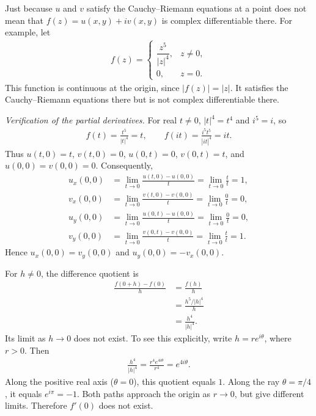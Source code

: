 \documentclass[11pt]{article}
\theoremstyle{plain}
\theoremstyle{definition}
\theoremstyle{remark}
\numberwithin{equation}{section}
\newcommand{\be}{\begin{eqnarray}}
\newcommand{\ee}{\end{eqnarray}}
\begin{document}
\begin{tcolorbox}[
 enhanced,breakable,
 colback=red!4,colframe=red!70!black,
 colbacktitle=red!70!black,coltitle=white,
 fonttitle=\bfseries,
 title={Warning: The Cauchy--Riemann equations alone do not suffice},
 boxrule=0.7pt,arc=2pt,
 left=6pt,right=6pt,top=5pt,bottom=5pt
]
Just because $u$ and $v$ satisfy the Cauchy--Riemann equations at a point
does not mean that $f(z)=u(x,y)+iv(x,y)$ is complex differentiable there. For example, let
\be
 f(z)=\begin{cases}
 \dfrac{z^5}{|z|^4},&z\ne0,\\[0.6em]
 0,&z=0.
 \end{cases}
\ee
This function is continuous at the origin, since $|f(z)|=|z|$.
It satisfies the Cauchy--Riemann equations there but is not complex
differentiable there.

\textit{Verification of the partial derivatives.} For real $t\ne0$, $|t|^4=t^4$ and $i^5=i$, so
\be
 f(t)=\frac{t^5}{|t|^4}=t,\qquad
 f(it)=\frac{i^5t^5}{|it|^4}=it.
\ee
Thus $u(t,0)=t$, $v(t,0)=0$, $u(0,t)=0$, $v(0,t)=t$, and
$u(0,0)=v(0,0)=0$. Consequently,
\begin{align*}
 u_x(0,0)&=\lim_{t\to0}\frac{u(t,0)-u(0,0)}t
 =\lim_{t\to0}\frac tt=1,\\
 v_x(0,0)&=\lim_{t\to0}\frac{v(t,0)-v(0,0)}t
 =\lim_{t\to0}\frac0t=0,\\
 u_y(0,0)&=\lim_{t\to0}\frac{u(0,t)-u(0,0)}t
 =\lim_{t\to0}\frac0t=0,\\
 v_y(0,0)&=\lim_{t\to0}\frac{v(0,t)-v(0,0)}t
 =\lim_{t\to0}\frac tt=1.
\end{align*}
Hence $u_x(0,0)=v_y(0,0)$ and $u_y(0,0)=-v_x(0,0)$.

For $h\ne0$, the difference quotient is
\begin{align*}
 \frac{f(0+h)-f(0)}h
 &=\frac{f(h)}h\\
 &=\frac{h^5/|h|^4}{h}\\
 &=\frac{h^4}{|h|^4}.
\end{align*}
Its limit as $h\to0$ does not exist. To see this explicitly, write
$h=re^{i\theta}$, where $r>0$. Then
\be
 \frac{h^4}{|h|^4}=\frac{r^4e^{4i\theta}}{r^4}=e^{4i\theta}.
\ee
Along the positive real axis ($\theta=0$), this quotient equals $1$.
Along the ray $\theta=\pi/4$, it equals $e^{i\pi}=-1$.
Both paths approach the origin as $r\to0$, but give different limits.
Therefore $f'(0)$ does not exist.
\end{tcolorbox}
%
\end{document}
